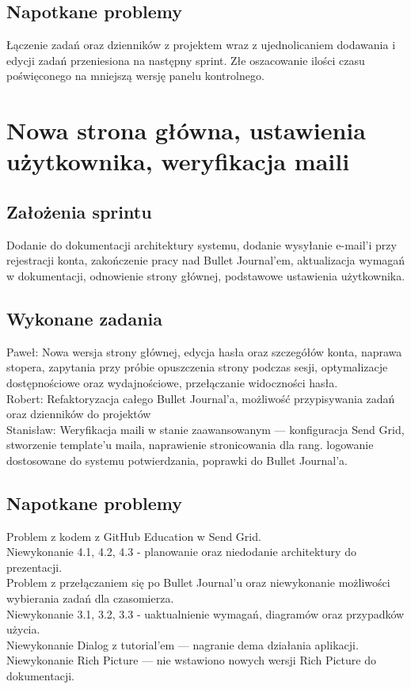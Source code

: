 \documentclass[a4paper,11pt]{report}
\begin{document}
\subsection {Napotkane problemy}
Łączenie zadań oraz dzienników z projektem wraz z ujednolicaniem dodawania i edycji zadań przeniesiona na następny sprint. Złe oszacowanie ilości czasu poświęconego na mniejszą wersję panelu kontrolnego.

\section {Nowa strona główna, ustawienia użytkownika, weryfikacja maili}
\subsection {Założenia sprintu}
Dodanie do dokumentacji architektury systemu, dodanie wysyłanie e-mail'i przy rejestracji konta,
 zakończenie pracy nad Bullet Journal'em, aktualizacja wymagań w dokumentacji, odnowienie strony głównej,
 podstawowe ustawienia użytkownika.
\subsection {Wykonane zadania}
Paweł: Nowa wersja strony głównej, edycja hasła oraz szczegółów konta,
 naprawa stopera, zapytania przy próbie opuszczenia strony podczas sesji,
 optymalizacje dostępnościowe oraz wydajnościowe, przełączanie widoczności hasła.\\
Robert: Refaktoryzacja całego Bullet Journal’a, możliwość przypisywania zadań oraz dzienników do projektów\\
Stanisław: Weryfikacja maili w stanie zaawansowanym — konfiguracja Send Grid,
 stworzenie template'u maila, naprawienie stronicowania dla rang.
 logowanie dostosowane do systemu potwierdzania, poprawki do Bullet Journal'a.\\
\subsection {Napotkane problemy}
Problem z kodem z GitHub Education w Send Grid.\\
Niewykonanie 4.1, 4.2, 4.3 - planowanie oraz niedodanie architektury do prezentacji.\\
Problem z przełączaniem się po Bullet Journal'u oraz niewykonanie możliwości wybierania zadań dla czasomierza.\\
Niewykonanie 3.1, 3.2, 3.3 - uaktualnienie wymagań, diagramów oraz przypadków użycia.\\
Niewykonanie Dialog z tutorial'em — nagranie dema działania aplikacji.\\
Niewykonanie Rich Picture — nie wstawiono nowych wersji Rich Picture do dokumentacji.\\
\end{document}
